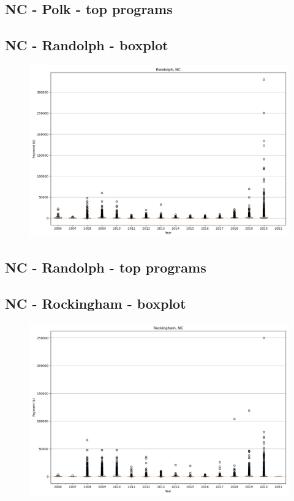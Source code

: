 \subsection*{NC - Polk - top programs}

\newpage
\subsection*{NC - Randolph - boxplot}
\begin{figure}[h]
\centering
\includegraphics[width=7in]{../output/boxplots/counties/Randolph-NC_boxplot.png}
\end{figure}


\subsection*{NC - Randolph - top programs}

\newpage
\subsection*{NC - Rockingham - boxplot}
\begin{figure}[h]
\centering
\includegraphics[width=7in]{../output/boxplots/counties/Rockingham-NC_boxplot.png}
\end{figure}


